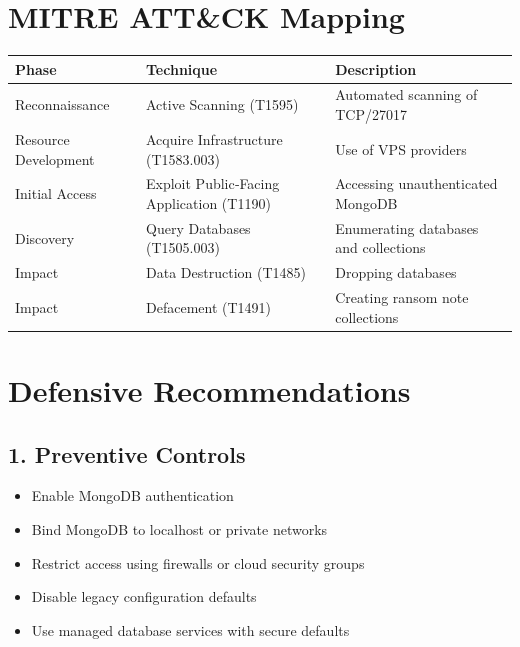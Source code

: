 \documentclass[12pt]{article}
\begin{document}
	\section{MITRE ATT\&CK Mapping}
	
	\begin{table}[h!]
		\centering
		\begin{tabularx}{\textwidth}{|l|l|X|}
			\hline
			\textbf{Phase} & \textbf{Technique} & \textbf{Description} \\
			\hline
			Reconnaissance & Active Scanning (T1595) & Automated scanning of TCP/27017 \\
			\hline
			Resource Development & Acquire Infrastructure (T1583.003) & Use of VPS providers \\
			\hline
			Initial Access & Exploit Public‑Facing Application (T1190) & Accessing unauthenticated MongoDB \\
			\hline
			Discovery & Query Databases (T1505.003) & Enumerating databases and collections \\
			\hline
			Impact & Data Destruction (T1485) & Dropping databases \\
			\hline
			Impact & Defacement (T1491) & Creating ransom note collections \\
			\hline
		\end{tabularx}
	\end{table}
	
	\section{Defensive Recommendations}
	
	\subsection*{1. Preventive Controls}
	\begin{itemize}
		\item Enable MongoDB authentication  
		\item Bind MongoDB to localhost or private networks  
		\item Restrict access using firewalls or cloud security groups  
		\item Disable legacy configuration defaults  
		\item Use managed database services with secure defaults  
	\end{itemize}
	
\end{document}
